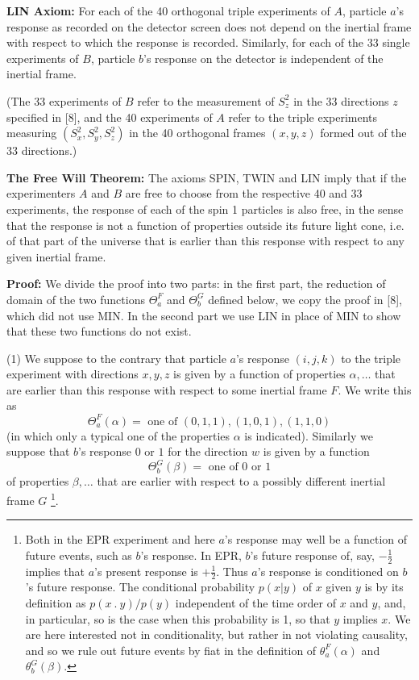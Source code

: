 \documentclass{article}
\begin{document}
{\bf LIN Axiom:} For each of the 40 orthogonal triple experiments of $A$, particle $a$'s response as recorded on the detector screen does not depend on the inertial frame with respect to which the response is recorded. Similarly, for each of the 33 single experiments of $B$, particle $b$'s response on the detector is independent of the inertial frame.

(The 33 experiments of $B$ refer to the measurement of $S_z^2$ in the 33 directions $z$ specified in [8], and the 40 experiments of $A$ refer to the triple experiments measuring $(S_x^2, S_y^2, S_z^2)$ in the 40 orthogonal frames $(x,y,z)$ formed out of the 33 directions.)

{\bf The Free Will Theorem:}  The axioms SPIN, TWIN and LIN imply that if the experimenters $A$ and $B$ are free to choose from the respective 40 and 33 experiments, the response of each of the spin 1 particles is also free, in the sense that the response is not a function of properties outside its future light cone, i.e. of that part of the universe that is earlier than this response with respect to any given inertial frame.

{\bf Proof:}  We divide the proof into two parts: in the first part, the reduction of domain of the two functions $\Theta_a^F$ and $\Theta_b^G$ defined below, we copy the proof in [8], which did not use MIN. In the second part we use LIN in place of MIN to show that these two functions do not exist. 


(1) We suppose to the contrary that particle $a$'s response $(i, j, k)$ to the triple experiment with directions $x, y, z$ is given by a function of properties $\alpha, \ldots$ that are earlier than this response with respect to some inertial frame $F$. We write this as \[\Theta_a^F(\alpha) = \mbox{ one of } (0,1,1),(1,0,1),(1,1,0)\] (in which only a typical one of the properties $\alpha$ is indicated). Similarly we suppose that $b$'s response $0$ or $1$ for the direction $w$ is given by a function \[\Theta^G_b(\beta)= \mbox{ one of } 0 \mbox{ or } 1\] of properties $\beta, \ldots$ that are earlier with respect to a possibly different inertial frame $G$  \footnote{Both in the EPR experiment and here $a$'s response may well be a function of future events, such as $b$'s response. In EPR, $b$'s future response of, say, $ -\frac{1}{2}$  implies that $a$'s present response is $+\frac{1}{2}$. Thus $a$'s response is conditioned on $b$'s future response. The conditional probability $p(x|y)$ of $x$ given $y$ is by its definition as $p(x\ .\ y)/p(y)$ independent of the time order of $x$ and $y$, and, in particular, so is the case when this probability is 1, so that $y$ implies $x$. We are here interested not in conditionality, but rather in not violating causality, and so we rule out future events by fiat in the definition of $\theta_a^F(\alpha)$ and $\theta_b^G(\beta).$  }. 
\end{document}
